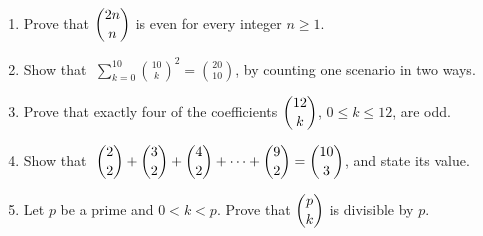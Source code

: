 \documentclass[11pt,a4paper]{article}
\begin{document}
\begin{enumerate}

\item Prove that $\dbinom{2n}{n}$ is even for every integer $n\geq1$.

\item Show that $\;\displaystyle\sum_{k=0}^{10}\binom{10}{k}^{2}=\binom{20}{10}$, by counting one scenario in two ways.

\item Prove that exactly four of the coefficients $\dbinom{12}{k}$, $0\leq k\leq12$, are odd.

\item Show that $\;\dbinom{2}{2}+\dbinom{3}{2}+\dbinom{4}{2}+\cdots+\dbinom{9}{2}=\dbinom{10}{3}$, and state its value.

\item Let $p$ be a prime and $0<k<p$. Prove that $\dbinom{p}{k}$ is divisible by $p$.

\end{enumerate}

\end{document}
